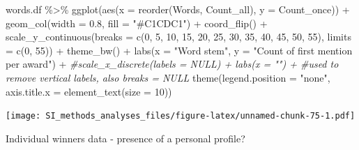 \documentclass[
]{article}
\newenvironment{Shaded}{\begin{snugshade}}{\end{snugshade}}
\newcommand{\AttributeTok}[1]{\textcolor[rgb]{0.77,0.63,0.00}{#1}}
\newcommand{\CommentTok}[1]{\textcolor[rgb]{0.56,0.35,0.01}{\textit{#1}}}
\newcommand{\DecValTok}[1]{\textcolor[rgb]{0.00,0.00,0.81}{#1}}
\newcommand{\FloatTok}[1]{\textcolor[rgb]{0.00,0.00,0.81}{#1}}
\newcommand{\FunctionTok}[1]{\textcolor[rgb]{0.00,0.00,0.00}{#1}}
\newcommand{\NormalTok}[1]{#1}
\newcommand{\SpecialCharTok}[1]{\textcolor[rgb]{0.00,0.00,0.00}{#1}}
\newcommand{\StringTok}[1]{\textcolor[rgb]{0.31,0.60,0.02}{#1}}
\begin{document}
\begin{Shaded}
\begin{Highlighting}[]
\NormalTok{words.df }\SpecialCharTok{\%\textgreater{}\%}
    \FunctionTok{ggplot}\NormalTok{(}\FunctionTok{aes}\NormalTok{(}\AttributeTok{x =} \FunctionTok{reorder}\NormalTok{(Words, Count\_all), }\AttributeTok{y =}\NormalTok{ Count\_once)) }\SpecialCharTok{+} 
    \FunctionTok{geom\_col}\NormalTok{(}\AttributeTok{width =} \FloatTok{0.8}\NormalTok{, }\AttributeTok{fill =} \StringTok{"\#C1CDC1"}\NormalTok{) }\SpecialCharTok{+}
    \FunctionTok{coord\_flip}\NormalTok{() }\SpecialCharTok{+}
    \FunctionTok{scale\_y\_continuous}\NormalTok{(}\AttributeTok{breaks =} \FunctionTok{c}\NormalTok{(}\DecValTok{0}\NormalTok{, }\DecValTok{5}\NormalTok{, }\DecValTok{10}\NormalTok{, }\DecValTok{15}\NormalTok{, }\DecValTok{20}\NormalTok{, }\DecValTok{25}\NormalTok{, }\DecValTok{30}\NormalTok{, }\DecValTok{35}\NormalTok{, }\DecValTok{40}\NormalTok{, }\DecValTok{45}\NormalTok{, }\DecValTok{50}\NormalTok{, }\DecValTok{55}\NormalTok{), }\AttributeTok{limits =} \FunctionTok{c}\NormalTok{(}\DecValTok{0}\NormalTok{, }\DecValTok{55}\NormalTok{)) }\SpecialCharTok{+}
    \FunctionTok{theme\_bw}\NormalTok{() }\SpecialCharTok{+} 
    \FunctionTok{labs}\NormalTok{(}\AttributeTok{x =} \StringTok{"Word stem"}\NormalTok{, }\AttributeTok{y =} \StringTok{"Count of first mention per award"}\NormalTok{) }\SpecialCharTok{+} 
    \CommentTok{\#scale\_x\_discrete(labels = NULL) + labs(x = "")  + \#used to remove vertical labels, also breaks = NULL}
    \FunctionTok{theme}\NormalTok{(}\AttributeTok{legend.position =} \StringTok{"none"}\NormalTok{, }\AttributeTok{axis.title.x =} \FunctionTok{element\_text}\NormalTok{(}\AttributeTok{size =} \DecValTok{10}\NormalTok{))}
\end{Highlighting}
\end{Shaded}

\texttt{[image: SI\_methods\_analyses\_files/figure-latex/unnamed-chunk-75-1.pdf]}

Individual winners data - presence of a personal profile?
\end{document}
